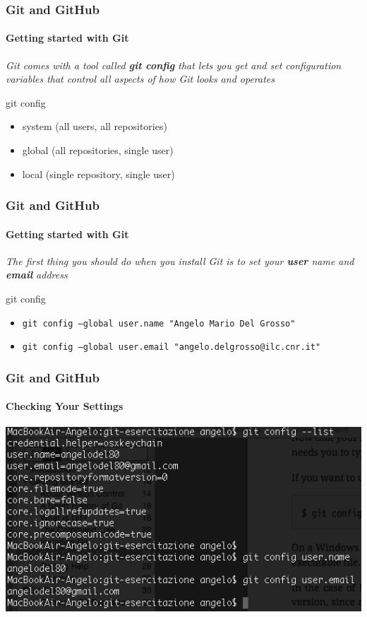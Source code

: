 \begin{frame}
    \frametitle{Git and GitHub}
    \framesubtitle{Getting started with Git}
    \addtocounter{nframe}{1}
	
	\emph{Git comes with a tool called \textbf{git config} that lets you get and set configuration variables that control all aspects of how Git looks and operates}

	\begin{block}{git config}
		\begin{itemize}
			\item system (all users, all repositories)
			\item global (all repositories, single user)
			\item local (single repository, single user)
		\end{itemize}
    \end{block}

\end{frame}

\begin{frame}
    \frametitle{Git and GitHub}
    \framesubtitle{Getting started with Git}
    \addtocounter{nframe}{1}
	
	\emph{The first thing you should do when you install Git is to set your \textbf{user} name and \textbf{email} address
	}

	\begin{block}{git config}
		\begin{itemize}
			\item \texttt{git config --global user.name "Angelo Mario Del Grosso"}
			\item \texttt{git config --global user.email "angelo.delgrosso@ilc.cnr.it"}
		\end{itemize}
    \end{block}

\end{frame}

\begin{frame}
	\frametitle{Git and GitHub}
    \framesubtitle{Checking Your Settings}
    \addtocounter{nframe}{1}

	\begin{center}
		\includegraphics[width=.8\textwidth]{imgs/git-config.png}
	\end{center}

\end{frame}

